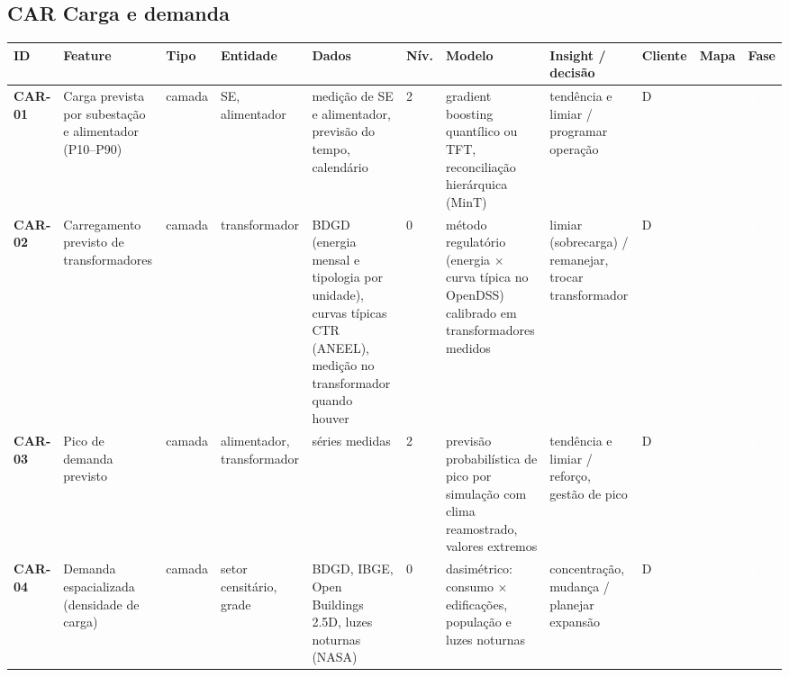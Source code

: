 \subsection*{CAR \textperiodcentered{} Carga e demanda}
\label{cat:CAR}
{\footnotesize\setlength{\tabcolsep}{3pt}
\begin{longtable}{@{}P{1.35cm}P{4.1cm}P{1.3cm}P{3.1cm}P{3.7cm}C{0.6cm}P{3.6cm}P{3.3cm}P{1.1cm}P{0.9cm}P{1.1cm}@{}}
\toprule
\textbf{ID} & \textbf{Feature} & \textbf{Tipo} & \textbf{Entidade} & \textbf{Dados} & \textbf{Nív.} & \textbf{Modelo} & \textbf{Insight / decisão} & \textbf{Cliente} & \textbf{Mapa} & \textbf{Fase} \\
\midrule\endhead
\textbf{CAR-01} & Carga prevista por subestação e alimentador (P10--P90) & camada & SE, alimentador & medição de SE e alimentador, previsão do tempo, calendário & 2 & gradient boosting quantílico ou TFT, reconciliação hierárquica (MinT) & tendência e limiar / programar operação & D &  & \colorbox{fV2}{\scriptsize \textcolor{white}{\textbf{V2}}} \\
\textbf{CAR-02} & Carregamento previsto de transformadores & camada & transformador & BDGD (energia mensal e tipologia por unidade), curvas típicas CTR (ANEEL), medição no transformador quando houver & 0 & método regulatório (energia $\times$ curva típica no OpenDSS) calibrado em transformadores medidos & limiar (sobrecarga) / remanejar, trocar transformador & D &  & \colorbox{fV2}{\scriptsize \textcolor{white}{\textbf{V2}}} \\
\textbf{CAR-03} & Pico de demanda previsto & camada & alimentador, transformador & séries medidas & 2 & previsão probabilística de pico por simulação com clima reamostrado, valores extremos & tendência e limiar / reforço, gestão de pico & D &  & \colorbox{fV2}{\scriptsize \textcolor{white}{\textbf{V2}}} \\
\textbf{CAR-04} & Demanda espacializada (densidade de carga) & camada & setor censitário, grade & BDGD, IBGE, Open Buildings 2.5D, luzes noturnas (NASA) & 0 & dasimétrico: consumo $\times$ edificações, população e luzes noturnas & concentração, mudança / planejar expansão & D &  & \colorbox{fV2}{\scriptsize \textcolor{white}{\textbf{V2}}} \\

\end{longtable}}

